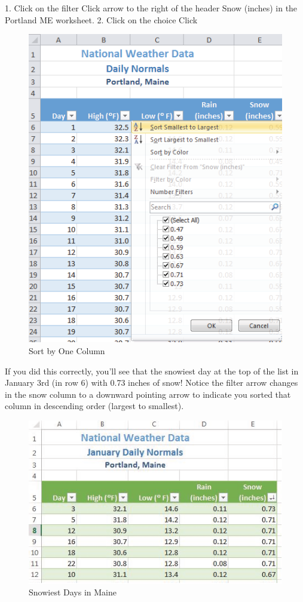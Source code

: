 1. Click on the filter Click arrow to the right of the header Snow (inches) in the Portland ME
worksheet.
2. Click on the choice Click %


\begin{figure}[H]
	\centering
	\includegraphics[width=\maxwidth{.95\linewidth}]{gfx/ch05_fig08}
	\caption{Sort by One Column}
	\label{05:fig08}
\end{figure}





If you did this correctly, you’ll see that the snowiest day at the top of the list in January 3rd (in row 6)
with 0.73 inches of snow! Notice the filter arrow changes in the snow column to a downward
pointing arrow to indicate you sorted that column in descending order (largest to smallest).


\begin{figure}[H]
	\centering
	\includegraphics[width=\maxwidth{.95\linewidth}]{gfx/ch05_fig09}
	\caption{Snowiest Days in Maine}
	\label{05:fig09}
\end{figure}







